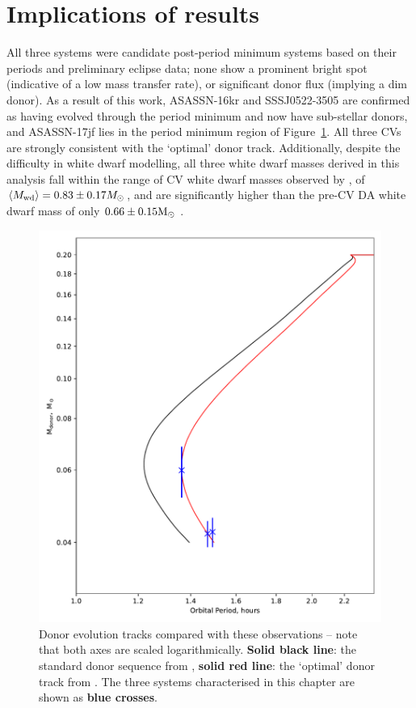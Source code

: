 \section{Implications of results}
\label{sect:discussion:three CVs with peculiar white dwarf colours}

All three systems were candidate post-period minimum systems based on their periods and preliminary eclipse data; none show a prominent bright spot (indicative of a low mass transfer rate), or significant donor flux (implying a dim donor).
As a result of this work, ASASSN-16kr and SSSJ0522-3505 are confirmed as having evolved through the period minimum and now have sub-stellar donors, and ASASSN-17jf lies in the period minimum region of Figure~\ref{fig:M2_vs_P}. All three CVs are strongly consistent with the `optimal' \citet{knigge11} donor track.
Additionally, despite the difficulty in white dwarf modelling, all three white dwarf masses derived in this analysis fall within the range of CV white dwarf masses observed by \citet{pala2020}, of $\langle M_{\rm wd}\rangle = 0.83 \pm 0.17 M_\odot$, and are significantly higher than the pre-CV DA white dwarf mass of only $0.66 \pm 0.15 {\rm M_\odot}$ \citep{mccleery2020}.
\begin{figure}
    \centering
    \includegraphics[width=\textwidth]{figures/results/three_cvs_with_weird_colours/GeneralFigs/M2_vs_P_withhumpers.pdf}
    \caption{Donor evolution tracks compared with these observations -- note that both axes are scaled logarithmically. {\bf Solid black line}: the standard donor sequence from \citet{knigge11}, {\bf solid red line}: the `optimal' donor track from \citet{knigge11}. The three systems characterised in this chapter are shown as {\bf blue crosses}.}
    \label{fig:M2_vs_P}
\end{figure}

